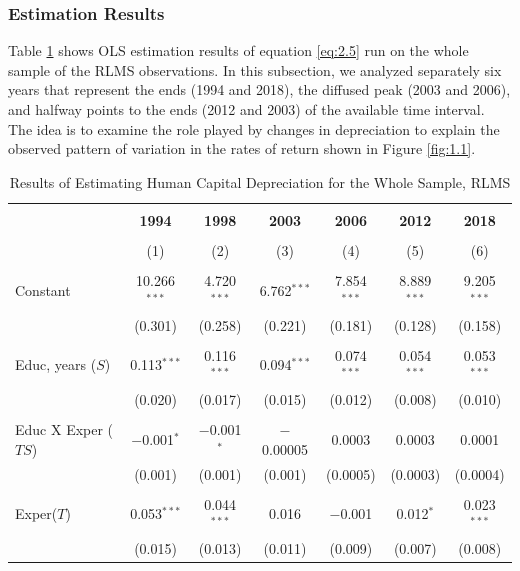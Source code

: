 \documentclass[12pt,a4paper]{article}
\numberwithin{equation}{section}
\begin{document}
\subsubsection{Estimation Results}
Table \ref{tab:2.1} shows OLS estimation results of equation \ref{eq:2.5} run on the whole sample of the RLMS observations. In this subsection, we analyzed separately six years that represent the ends (1994 and 2018), the diffused peak (2003 and 2006), and halfway points to the ends (2012 and 2003) of the available time interval. The idea is to examine the role played by changes in depreciation to explain the observed pattern of variation in the rates of return shown in Figure \ref{fig:1.1}. 

\setlength{\tabcolsep}{2pt}
\begin{table}[h!]
	\centering 
	\caption{Results of Estimating Human Capital Depreciation for the Whole Sample, RLMS} 
	\label{tab:2.1}
	\begin{tabular}{@{\extracolsep{3pt}}lcccccc} 
		\\[-1.8ex]\hline 
		\hline \\[-1.8ex] 
		& \textbf{1994} & \textbf{1998} & \textbf{2003} & \textbf{2006} & \textbf{2012} & \textbf{2018} \\ 
		\\[-1.8ex] & (1) & (2) & (3) & (4) & (5) & (6)\\ 
		\hline \\[-1.8ex] 
		Constant & 10.266$^{***}$ & 4.720$^{***}$ & 6.762$^{***}$ & 7.854$^{***}$ & 8.889$^{***}$ & 9.205$^{***}$ \\ 
		& (0.301) & (0.258) & (0.221) & (0.181) & (0.128) & (0.158) \\ 
		& & & & & & \\ 
		Educ, years ($S$) & 0.113$^{***}$ & 0.116$^{***}$ & 0.094$^{***}$ & 0.074$^{***}$ & 0.054$^{***}$ & 0.053$^{***}$ \\ 
		& (0.020) & (0.017) & (0.015) & (0.012) & (0.008) & (0.010) \\ 
		& & & & & & \\ 
		Educ X Exper ($TS$) & $-$0.001$^{*}$ & $-$0.001$^{*}$ & $-$0.00005 & 0.0003 & 0.0003 & 0.0001 \\ 
		& (0.001) & (0.001) & (0.001) & (0.0005) & (0.0003) & (0.0004) \\ 
		& & & & & & \\ 
		Exper($T$) & 0.053$^{***}$ & 0.044$^{***}$ & 0.016 & $-$0.001 & 0.012$^{*}$ & 0.023$^{***}$ \\ 
		& (0.015) & (0.013) & (0.011) & (0.009) & (0.007) & (0.008) \\ 

\end{tabular}
\end{table}
\end{document}
